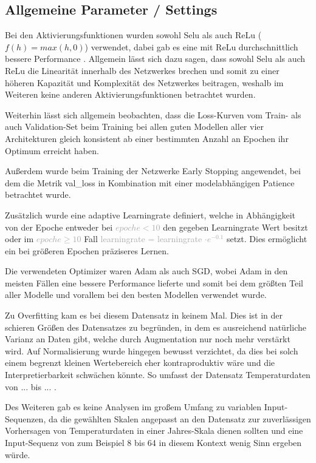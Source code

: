 \documentclass[manuscript,screen,review]{acmart}
\begin{document}
\subsection{Allgemeine Parameter / Settings}
Bei den Aktivierungsfunktionen wurden sowohl Selu  als auch ReLu ($f(h)=max(h,0)$) verwendet, dabei gab es eine mit ReLu durchschnittlich bessere Performance . Allgemein lässt sich dazu sagen, dass sowohl Selu als auch ReLu die Linearität innerhalb des Netzwerkes brechen und somit zu einer höheren Kapazität und Komplexität des Netzwerkes beitragen, weshalb im Weiteren keine anderen Aktivierungsfunktionen betrachtet wurden.

Weiterhin lässt sich allgemein beobachten, dass die Loss-Kurven vom Train- als auch Validation-Set beim Training bei allen guten Modellen aller vier Architekturen gleich konsistent ab einer bestimmten Anzahl an Epochen ihr Optimum erreicht haben.


Außerdem wurde beim Training der Netzwerke Early Stopping angewendet, bei dem die Metrik val\_loss in Kombination mit einer modelabhängigen Patience betrachtet wurde. 

Zusätzlich wurde eine adaptive Learningrate definiert, welche in Abhängigkeit von der Epoche entweder bei \textcolor{darkgray}{$epoche < 10$} den gegeben Learningrate Wert besitzt oder im \textcolor{darkgray}{$epoche \geq 10$} Fall \textcolor{darkgray}{learningrate = learningrate $\cdot e^{-0.1}$} setzt. Dies ermöglicht ein bei größeren Epochen präziseres Lernen.

Die verwendeten Optimizer waren Adam als auch SGD, wobei Adam in den meisten Fällen eine bessere Performance lieferte und somit bei dem größten Teil aller Modelle und vorallem bei den besten Modellen verwendet wurde. 

Zu Overfitting kam es bei diesem Datensatz in keinem Mal. Dies ist in der schieren Größen des Datensatzes zu begründen, in dem es ausreichend natürliche Varianz an Daten gibt, welche durch Augmentation nur noch mehr verstärkt wird.
Auf Normalisierung wurde hingegen bewusst verzichtet, da dies bei solch einem begrenzt kleinen Wertebereich eher kontraproduktiv wäre und die Interpretierbarkeit schwächen könnte. So umfasst der Datensatz Temperaturdaten von  ... bis ... .

Des Weiteren gab es keine Analysen im großem Umfang zu variablen Input-Sequenzen, da die gewählten Skalen angepasst an den Datensatz zur zuverlässigen Vorhersagen von Temperaturdaten in einer Jahres-Skala dienen sollten und eine Input-Sequenz von zum Beispiel 8 bis 64 in diesem Kontext wenig Sinn ergeben würde.
\end{document}
